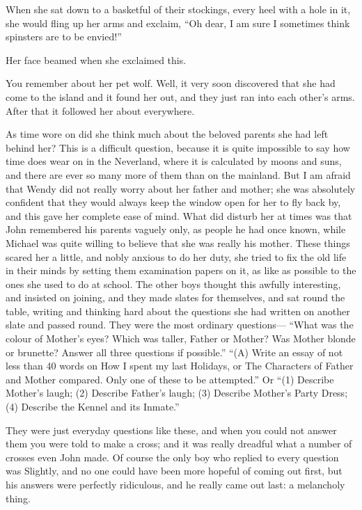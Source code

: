 When she sat down to a basketful of their stockings, every heel with a hole in it,
she would fling up her arms and exclaim, “Oh dear, I am sure I sometimes think spinsters are to be envied!”

Her face beamed when she exclaimed this.

You remember about her pet wolf.
Well, it very soon discovered that she had come to the island and it found her out,
and they just ran into each other’s arms.
After that it followed her about everywhere.

As time wore on did she think much about the beloved parents she had left behind her?
This is a difficult question,
because it is quite impossible to say how time does wear on in the Neverland,
where it is calculated by moons and suns, and there are ever so many more of them than on the mainland.
But I am afraid that Wendy did not really worry about her father and mother;
she was absolutely confident that they would always keep the window open for her to fly back by,
and this gave her complete ease of mind.
What did disturb her at times was that John remembered his parents vaguely only,
as people he had once known, while Michael was quite willing to believe that she was really his mother.
These things scared her a little,
and nobly anxious to do her duty, she tried to fix the old life in their minds
by setting them examination papers on it, as like as possible to the ones she used to do at school.
The other boys thought this awfully interesting, and insisted on joining,
and they made slates for themselves, and sat round the table,
writing and thinking hard about the questions she had written on another slate and passed round.
They were the most ordinary questions—%
“What was the colour of Mother’s eyes?
Which was taller, Father or Mother?
Was Mother blonde or brunette?
Answer all three questions if possible.”
“(A) Write an essay of not less than 40 words on How I spent my last Holidays,
or The Characters of Father and Mother compared.
Only one of these to be attempted.”
Or “(1) Describe Mother’s laugh;
(2) Describe Father’s laugh;
(3) Describe Mother’s Party Dress;
(4) Describe the Kennel and its Inmate.”

They were just everyday questions like these,
and when you could not answer them you were told to make a cross;
and it was really dreadful what a number of crosses even John made.
Of course the only boy who replied to every question was Slightly,
and no one could have been more hopeful of coming out first,
but his answers were perfectly ridiculous, and he really came out last:
a melancholy thing.


